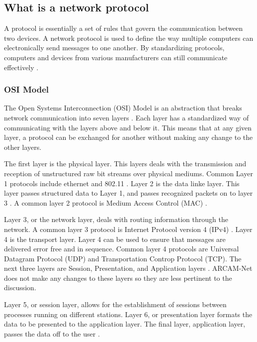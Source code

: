 \subsection{What is a network protocol}

A protocol is essentially a set of rules that govern the communication between two devices. A network protocol is used to define the way multiple computers can electronically send messages to one another. By standardizing protocols, computers and devices from various manufacturers can still communicate effectively \cite{6840086} \cite{0029}. 

\subsubsection{OSI Model}

The Open Systems Interconnection (OSI) Model is an abstraction that breaks network communication into seven layers \cite{6840086} \cite{0030}. Each layer has a standardized way of communicating with the layers above and below it. This means that at any given layer, a protocol can be exchanged for another without making any change to the other layers\cite{6840086}. 

The first layer is the physical layer. This layers deals with the transmission and reception of unstructured raw bit streams over physical mediums. Common Layer 1 protocols include ethernet and 802.11 \cite{6014631} \cite{0030}. Layer 2 is the data linke layer. This layer passes structured data to Layer 1, and passes recognized packets on to layer 3 \cite{6840086}. A common layer 2 protocol is Medium Access Control (MAC) \cite{6014631} \cite{0030}. 

Layer 3, or the network layer, deals with routing information through the network. A common layer 3 protocol is Internet Protocol version 4 (IPv4) \cite{6014631} \cite{0031}. Layer 4 is the transport layer. Layer 4 can be used to ensure that messages are delivered error free and in sequence. Common layer 4 protocols are Universal Datagram Protocol (UDP) and Transportation Controp Protocol (TCP). The next three layers are Session, Presentation, and Application layers \cite{6840086} \cite{0030}. ARCAM-Net does not make any changes to these layers so they are less pertinent to the discussion. 

Layer 5, or session layer, allows for the establishment of sessions between processes running on different stations. Layer 6, or presentation layer formats the data to be presented to the application layer. The final layer, application layer, passes the data off to the user \cite{6840086}. 

